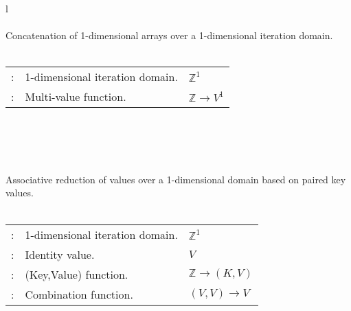 \begin{figure*}
\begin{tabular}{l}
 \\
\vspace{-7pt} \\
Concatenation of 1-dimensional arrays over a 1-dimensional iteration domain. \\
\vspace{-8pt} \\
{
\begin{tabular}{lll}
\argg{d}: & \hspace{-7pt}1-dimensional iteration domain. & $\mathbb{Z}^1$ \\
\argg{n}: & \hspace{-7pt}Multi-value function. & $\mathbb{Z} \rightarrow V^1$ \\
\end{tabular}
}
\\
\\
 \\
\vspace{-7pt} \\
Associative reduction of values over a 1-dimensional domain based on paired key values. \\
\vspace{-8pt} \\
{
\begin{tabular}{lll}
\argg{d}: & \hspace{-7pt}1-dimensional iteration domain. & $\mathbb{Z}^1$ \\
\argg{z}: & \hspace{-7pt}Identity value. & $V$ \\
\argg{g}: & \hspace{-7pt}(Key,Value) function. & $\mathbb{Z} \rightarrow (K,V)$ \\
\argg{c}: & \hspace{-7pt}Combination function. & $(V,V) \rightarrow V$ \\
\end{tabular}
} \\
\end{tabular}




\end{figure*}

